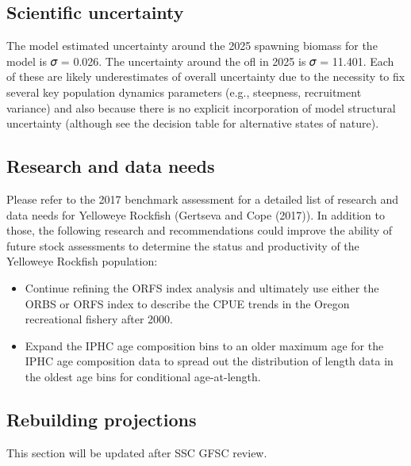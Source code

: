 \documentclass[
]{scrartcl}
\providecommand{\tightlist}{%
  \setlength{\itemsep}{0pt}\setlength{\parskip}{0pt}}\usepackage{longtable,booktabs,array}
\begin{document}
\subsection*{Scientific uncertainty}\label{scientific-uncertainty}

The model estimated uncertainty around the 2025 spawning biomass for the
model is 𝜎 = 0.026. The uncertainty around the \gls{ofl} in 2025 is 𝜎 =
11.401. Each of these are likely underestimates of overall uncertainty
due to the necessity to fix several key population dynamics parameters
(e.g., steepness, recruitment variance) and also because there is no
explicit incorporation of model structural uncertainty (although see the
decision table for alternative states of nature).

\subsection*{Research and data needs}\label{research-and-data-needs}

Please refer to the 2017 benchmark assessment for a detailed list of
research and data needs for Yelloweye Rockfish (Gertseva and Cope
(2017)). In addition to those, the following research and
recommendations could improve the ability of future stock assessments to
determine the status and productivity of the Yelloweye Rockfish
population:

\begin{itemize}
\tightlist
\item
  Continue refining the ORFS index analysis and ultimately use either
  the ORBS or ORFS index to describe the CPUE trends in the Oregon
  recreational fishery after 2000.
\item
  Expand the IPHC age composition bins to an older maximum age for the
  IPHC age composition data to spread out the distribution of length
  data in the oldest age bins for conditional age-at-length.
\end{itemize}

\subsection*{Rebuilding projections}\label{rebuilding-projections}

This section will be updated after SSC GFSC review.
\end{document}
